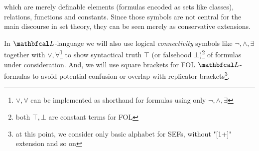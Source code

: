 which are merely definable elements (formulas encoded as sets like classes), relations, functions and constants. Since those symbols are not central for the main discourse in set theory, they can be seen merely as conservative extensions.

In $\lsign$-language we will also use logical \textit{connectivity} symbols like $\neg, \land, \exists$ together with $\lor, \forall$\footnote{$\lor, \forall$ can be implemented as shorthand for formulas using only $\neg, \land, \exists$\cite{marker2002model}} to show syntactical truth $\top$ (or falsehood $\bot$)\footnote{both $\top,\bot$ are constant terms for FOL} of formulas under consideration. And, we will use square brackets for FOL $\lsign$-formulas to avoid potential confusion or overlap with replicator brackets\footnote{at this point, we consider only basic alphabet for SEFs, without "[1+]" extension and so on}.

